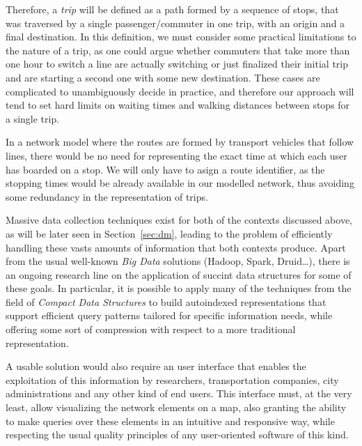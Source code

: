 \documentclass[a4paper,10pt,twoside]{book}
\begin{document}
	Therefore, a \textit{trip} will be defined as a path formed by a sequence of stops, that was traversed by a single passenger/commuter in one trip, with an origin and a final destination. In this definition, we must consider some practical limitations to the nature of a trip, as one could argue whether commuters that take more than one hour to switch a line are actually switching or just finalized their initial trip and are starting a second one with some new destination. These cases are complicated to unambiguously decide in practice, and therefore our approach will tend to set hard limits on waiting times and walking distances between stops for a single trip.
	
	In a network model where the routes are formed by transport vehicles that follow lines, there would be no need for representing the exact time at which each user has boarded on a stop. We will only have to asign a route identifier, as the stopping times would be already available in our modelled network, thus avoiding some redundancy in the representation of trips.
	
	Massive data collection techniques exist for both of the contexts discussed above, as will be later seen in Section~\ref{sec:dm}, leading to the problem of efficiently handling these vasts amounts of information that both contexts produce. Apart from the usual well-known \textit{Big Data} solutions (Hadoop, Spark, Druid\ldots), there is an ongoing research line on the application of succint data structures for some of these goals. In particular, it is possible to apply many of the techniques from the field of \textit{Compact Data Structures} to build autoindexed representations that support efficient query patterns tailored for specific information needs, while offering some sort of compression with respect to a more traditional representation.
	
	A usable solution would also require an user interface that enables the exploitation of this information by researchers, transportation companies, city administrations and any other kind of end users. This interface must, at the very least, allow visualizing the network elements on a map, also granting the ability to make queries over these elements in an intuitive and responsive way, while respecting the usual quality principles of any user-oriented software of this kind.
	
\end{document}
